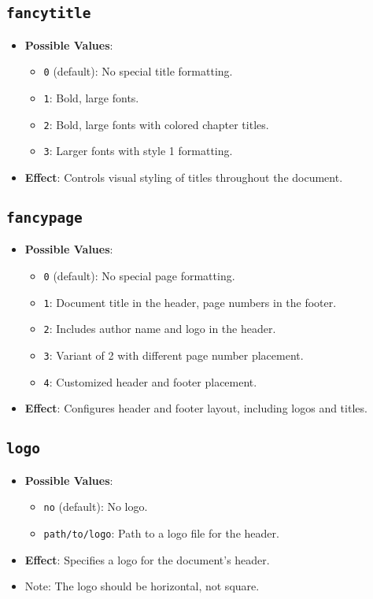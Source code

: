 \documentclass[12pt,twoside]{report}
\begin{document}
\subsection{\texttt{fancytitle}}
\begin{itemize}
    \item \textbf{Possible Values}: 
    \begin{itemize}
        \item \texttt{0} (default): No special title formatting.
        \item \texttt{1}: Bold, large fonts.
        \item \texttt{2}: Bold, large fonts with colored chapter titles.
        \item \texttt{3}: Larger fonts with style 1 formatting.
    \end{itemize}
    \item \textbf{Effect}: Controls visual styling of titles throughout the document.
\end{itemize}

\subsection{\texttt{fancypage}}
\begin{itemize}
    \item \textbf{Possible Values}:
    \begin{itemize}
        \item \texttt{0} (default): No special page formatting.
        \item \texttt{1}: Document title in the header, page numbers in the footer.
        \item \texttt{2}: Includes author name and logo in the header.
        \item \texttt{3}: Variant of 2 with different page number placement.
        \item \texttt{4}: Customized header and footer placement.
    \end{itemize}
    \item \textbf{Effect}: Configures header and footer layout, including logos and titles.
\end{itemize}

\subsection{\texttt{logo}}
\begin{itemize}
    \item \textbf{Possible Values}: 
    \begin{itemize}
        \item \texttt{no} (default): No logo.
        \item \texttt{path/to/logo}: Path to a logo file for the header.
    \end{itemize}
    \item \textbf{Effect}: Specifies a logo for the document’s header.
    \item Note: The logo should be horizontal, not square.
\end{itemize}
\end{document}
